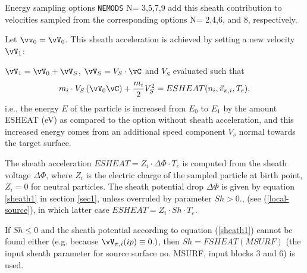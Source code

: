 Energy sampling options \texttt{NEMODS} N= 3,5,7,9 add this sheath contribution to velocities sampled from the corresponding options N= 2,4,6, and 8, respectively.

Let $\vv_0=\vV_0$. This sheath acceleration is achieved by setting a new velocity $\vV_1$:

${\vV}_1   =
{\vV}_0   + {\vV}_S$, ${\vV}_S   =
V_S
   \cdot   \vC $ and $V_S$ evaluated such that
\begin{equation}
m_i    \cdot    V_S \left
( {\vV}_0
\vC \right )   +   \frac{m_i}{2}
V_S^2   =
ESHEAT(n_i,{\vec{v}}_{\pi,i} ,T_e),
\end{equation}
i.e., the energy $E$ of the particle is increased from $E_0$ to $E_1$ by the amount ESHEAT (eV) as
compared to the option without sheath acceleration, and this increased energy comes from an additional speed component $V_s$ normal towards the target surface.

The sheath acceleration $ESHEAT = Z_i \cdot \Delta \Phi \cdot T_e$  is computed from the sheath voltage
$\Delta \Phi$, where $Z_i$ is
the electric charge of the sampled particle at birth point, $Z_i=0$ for neutral particles.
The sheath potential drop $\Delta \Phi$ is
given by equation \ref{sheath1} in section \ref{sec1}, unless overruled by parameter $Sh>0.$, (see (\ref{local-source}), in which latter case $ESHEAT=Z_i \cdot Sh \cdot T_e$.

If $Sh\leq 0$ and the sheath potential according to equation (\ref{sheath1}) cannot be found either (e.g. because $\vV_{\pi,i}(ip) \equiv 0.)$, then
$Sh = FSHEAT(MSURF)$ (the input sheath parameter for source surface no. MSURF, input blocks 3 and 6) is used.



